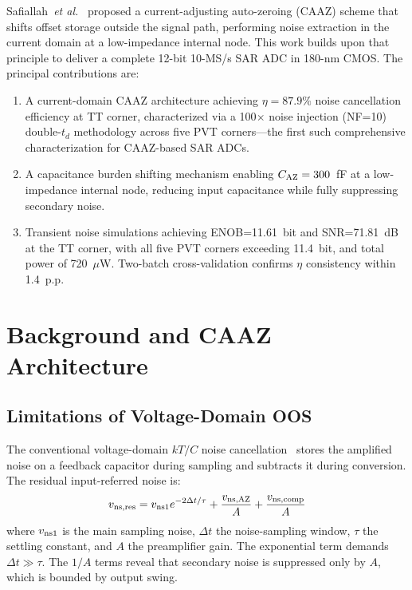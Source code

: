 \documentclass[journal]{IEEEtran}
\begin{document}
Safiallah~\textit{et al.}~\cite{safiallah2023_Currentadjusting} proposed a current-adjusting auto-zeroing (CAAZ) scheme that shifts offset storage outside the signal path, performing noise extraction in the current domain at a low-impedance internal node. This work builds upon that principle to deliver a complete 12-bit 10-MS/s SAR ADC in 180-nm CMOS. The principal contributions are:
\begin{enumerate}
    \item A current-domain CAAZ architecture achieving $\eta=87.9\%$ noise cancellation efficiency at TT corner, characterized via a 100$\times$ noise injection (NF=10) double-$t_d$ methodology across five PVT corners---the first such comprehensive characterization for CAAZ-based SAR ADCs.
    \item A capacitance burden shifting mechanism enabling $C_{\rm AZ}=300$~fF at a low-impedance internal node, reducing input capacitance while fully suppressing secondary noise.
    \item Transient noise simulations achieving ENOB=11.61~bit and SNR=71.81~dB at the TT corner, with all five PVT corners exceeding 11.4~bit, and total power of 720~$\mu$W. Two-batch cross-validation confirms $\eta$ consistency within 1.4~p.p.
\end{enumerate}

\section{Background and CAAZ Architecture}
\label{sec:caaz}

\subsection{Limitations of Voltage-Domain OOS}

The conventional voltage-domain $kT/C$ noise cancellation~\cite{liu13bit0005mm240MS2020} stores the amplified noise on a feedback capacitor during sampling and subtracts it during conversion. The residual input-referred noise is:
\begin{equation}
v_{\rm ns,res}=v_{\rm ns1}e^{-2\Delta t/\tau}+\frac{v_{\rm ns,AZ}}{A}+\frac{v_{\rm ns,comp}}{A}
\label{eq:oos}
\end{equation}
where $v_{\rm ns1}$ is the main sampling noise, $\Delta t$ the noise-sampling window, $\tau$ the settling constant, and $A$ the preamplifier gain. The exponential term demands $\Delta t\gg\tau$. The $1/A$ terms reveal that secondary noise is suppressed only by $A$, which is bounded by output swing.
\end{document}

